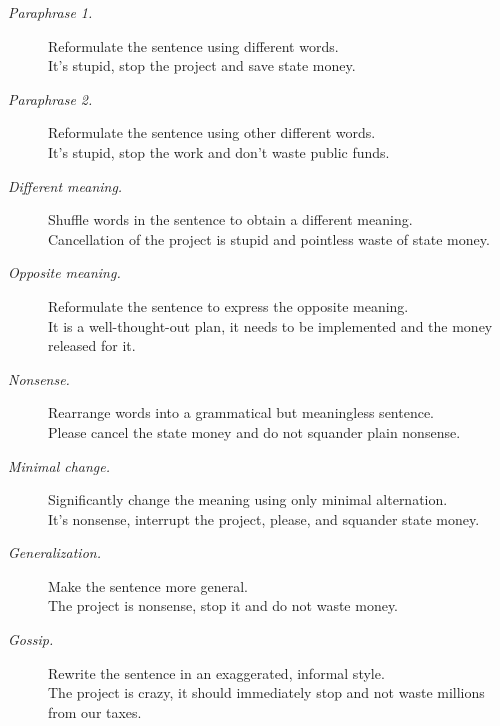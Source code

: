 \begin{description}
\item[\textit{Paraphrase 1.}] Reformulate the sentence using different words. \\
{It's stupid, stop the project and save state money.}

\item[\textit{Paraphrase 2.}] Reformulate the sentence using other different words. \\
{It's stupid, stop the work and don't waste public funds.}

\item[\textit{Different meaning.}] Shuffle words in the sentence to obtain a different meaning. \\
{Cancellation of the project is stupid and pointless waste of state money.}

\item[\textit{Opposite meaning.}] Reformulate the sentence to express the opposite meaning. \\
{It is a well-thought-out plan, it needs to be implemented and the money released for it.}

\item[\textit{Nonsense.}] Rearrange words into a grammatical but meaningless sentence. \\
{Please cancel the state money and do not squander plain nonsense.}

\item[\textit{Minimal change.}] Significantly change the meaning using only minimal alternation. \\
{It's nonsense, interrupt the project, please, and squander state money.}

\item[\textit{Generalization.}] Make the sentence more general. \\
{The project is nonsense, stop it and do not waste money.}

\item[\textit{Gossip.}] Rewrite the sentence in an exaggerated, informal style. \\
{The project is crazy, it should immediately stop and not waste millions from our taxes.}


\end{description}
